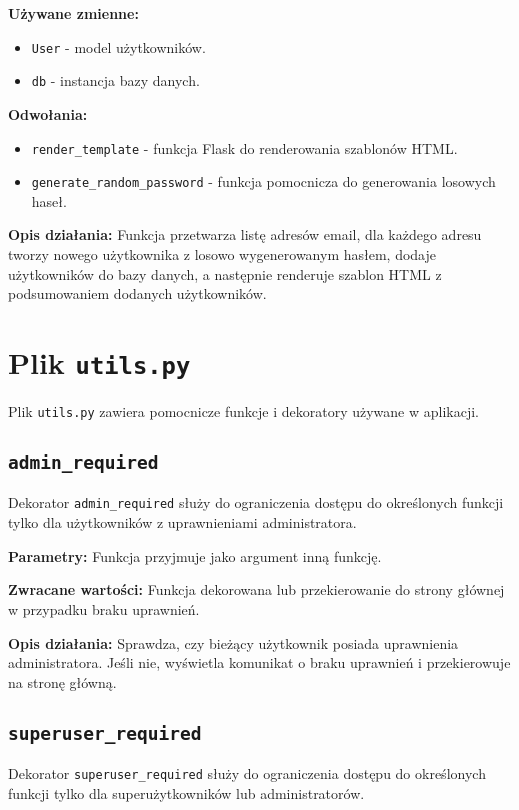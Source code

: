 \documentclass[12pt,a4paper]{report}
\begin{document}
\textbf{Używane zmienne:}
\begin{itemize}
    \item \texttt{User} - model użytkowników.
    \item \texttt{db} - instancja bazy danych.
\end{itemize}

\textbf{Odwołania:}
\begin{itemize}
    \item \texttt{render\_template} - funkcja Flask do renderowania szablonów HTML.
    \item \texttt{generate\_random\_password} - funkcja pomocnicza do generowania losowych haseł.
\end{itemize}

\textbf{Opis działania:}
Funkcja przetwarza listę adresów email, dla każdego adresu tworzy nowego użytkownika z losowo wygenerowanym hasłem, dodaje użytkowników do bazy danych, a następnie renderuje szablon HTML z podsumowaniem dodanych użytkowników.

\section{Plik \texttt{utils.py}}
Plik \texttt{utils.py} zawiera pomocnicze funkcje i dekoratory używane w aplikacji.

\subsection{\texttt{admin\_required}}
Dekorator \texttt{admin\_required} służy do ograniczenia dostępu do określonych funkcji tylko dla użytkowników z uprawnieniami administratora.

\textbf{Parametry:} Funkcja przyjmuje jako argument inną funkcję.

\textbf{Zwracane wartości:} Funkcja dekorowana lub przekierowanie do strony głównej w przypadku braku uprawnień.

\textbf{Opis działania:}
Sprawdza, czy bieżący użytkownik posiada uprawnienia administratora. Jeśli nie, wyświetla komunikat o braku uprawnień i przekierowuje na stronę główną.

\subsection{\texttt{superuser\_required}}
Dekorator \texttt{superuser\_required} służy do ograniczenia dostępu do określonych funkcji tylko dla superużytkowników lub administratorów.
\end{document}

